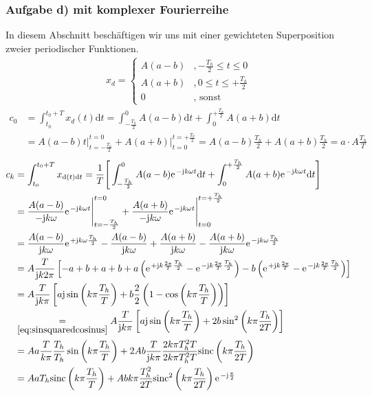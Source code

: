 \documentclass[11pt,a4paper,DIV=12]{scrartcl}
\newcommand{\diff}{\mathrm{d}}
\newcommand{\sinc}{\mathrm{sinc}}
\begin{document}
\subsubsection*{Aufgabe d) mit komplexer Fourierreihe}
%
In diesem Abschnitt beschäftigen wir uns mit einer gewichteten Superposition zweier
periodischer Funktionen.
%
%
\begin{align}
	x_d=
		\begin{cases}
			A(a-b)&,-\frac{T_h}{2}\leq t \leq 0 \\
			A(a+b)&,0\leq t \leq +\frac{T_h}{2}\\
			0&,\text{ sonst}
		\end{cases}
\end{align}
%
%
\begin{align}
	c_0&=\int_{t_0}^{t_0+T}x_d(t)\diff t
	=\int_{-\frac{T_h}{2}}^0A(a-b)\diff t+\int_0^{+\frac{T_h}{2}}A(a+b)\diff t\nonumber \\
	&=A(a-b)t\Bigg |_{t=-\frac{T_h}{2}}^{t=0}+A(a+b)\Bigg |_{t=0}^{t=+\frac{T_h}{2}}
	=A(a-b)\frac{T_h}{2}+A(a+b)\frac{T_h}{2}=a\cdot A\frac{T_h}{T}
\end{align}
%
%
%
\begin{align}
	c_k&=\int_{t_0}^{t_0+T}x_{\diff (t)\diff t}
	=\frac{1}{T}\Bigg [\int_{-\frac{T_h}{2}}^0A(a-b)\e^{-\im k \omega t}\diff t+\int_0^{+\frac{T_h}{2}}A(a+b)\e^{-\im k \omega t}\diff t\Bigg ]\nonumber \\
	&=\frac{A(a-b)}{-\im k \omega}\e^{-\im k \omega t}\Bigg |_{t=-\frac{T_h}{2}}^{t=0}+\frac{A(a+b)}{-\im k \omega}\e^{-\im k \omega t}\Bigg |_{t=0}^{t=+\frac{T_h}{2}}\nonumber \\
	&=\frac{A(a-b)}{\im k \omega}\e^{+\im k \omega \frac{T_h}{2}}-\frac{A(a-b)}{\im k \omega}+\frac{A(a+b)}{\im k \omega}-\frac{A(a+b)}{\im k \omega}\e^{-\im k \omega \frac{T_h}{2}}\nonumber \\
	&=A\frac{T}{\im k 2\pi}\left [-a+b+a+b+a\left (\e^{+\im k \frac{2\pi}{T}\frac{T_h}{2}}-\e^{-\im k \frac{2\pi}{T}\frac{T_h}{2}}\right )-b\left (\e^{+\im k \frac{2\pi}{T}}-\e^{-\im k \frac{2\pi}{T}\frac{T_h}{2}}\right )\right ]\nonumber \\
	&=A\frac{T}{\im k\pi}\left [a\im\sin\left(k\pi\frac{T_h}{T}\right)+b\frac{2}{2}\left(1-\cos\left(k\pi\frac{T_h}{T}\right)\right)\right ]\nonumber\\
	&\underset{\ref{eq:sinsquaredcosinus}}{=}A\frac{T}{\im k\pi}\left[a\im\sin\left(k\pi\frac{T_h}{T}\right)+2b\sin^2\left(k\pi\frac{T_h}{2T}\right)\right]\nonumber\\
	&=Aa\frac{T}{k\pi}\frac{T_h}{T_h}\sin\left(k\pi\frac{T_h}{T}\right)+2Ab\frac{T}{\im k\pi}\frac{2k\pi T_h^2T}{2k\pi T_h^2T}\sinc\left(k\pi\frac{T_h}{2T}\right)\nonumber\\
	&=AaT_h\sinc\left(k\pi\frac{T_h}{T}\right)+Abk\pi\frac{T_h^2}{2T}\sinc^2\left(k\pi\frac{T_h}{2T}\right)\e^{-\im\frac{\pi}{2}}
\end{align}
\end{document}

